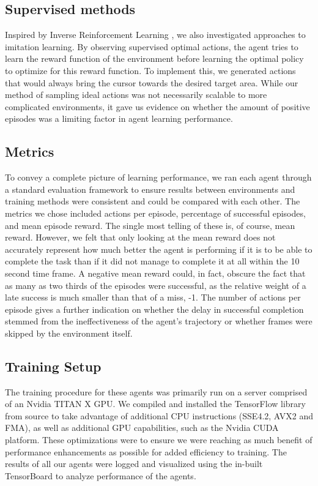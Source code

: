 \documentclass[10pt,journal,compsoc]{IEEEtran}
\begin{document}
\subsection{Supervised methods}
Inspired by Inverse Reinforcement Learning \cite{abbeel2004apprenticeship}, we also investigated approaches to imitation learning. By observing supervised optimal actions, the agent tries to learn the reward function of the environment before learning the optimal policy to optimize for this reward function. To implement this, we generated actions that would always bring the cursor towards the desired target area. While our method of sampling ideal actions was not necessarily scalable to more complicated environments, it gave us evidence on whether the amount of positive episodes was a limiting factor in agent learning performance.

\subsection{Metrics}
To convey a complete picture of learning performance, we ran each agent through a standard evaluation framework to ensure results between environments and training methods were consistent and could be compared with each other. The metrics we chose included actions per episode, percentage of successful episodes, and mean episode reward. The single most telling of these is, of course, mean reward. However, we felt that only looking at the mean reward does not accurately represent how much better the agent is performing if it is to be able to complete the task than if it did not manage to complete it at all within the 10 second time frame. A negative mean reward could, in fact, obscure the fact that as many as two thirds of the episodes were successful, as the relative weight of a late success is much smaller than that of a miss, -1. The number of actions per episode gives a further indication on whether the delay in successful completion stemmed from the ineffectiveness of the agent's trajectory or whether frames were skipped by the environment itself.

\subsection{Training Setup}
The training procedure for these agents was primarily run on a server comprised of an Nvidia TITAN X GPU. We compiled and installed the TensorFlow library from source to take advantage of additional CPU instructions (SSE4.2, AVX2 and FMA), as well as additional GPU capabilities, such as the Nvidia CUDA platform. These optimizations were to ensure we were reaching as much benefit of performance enhancements as possible for added efficiency to training. The results of all our agents were logged and visualized using the in-built TensorBoard to analyze performance of the agents.
\end{document}
